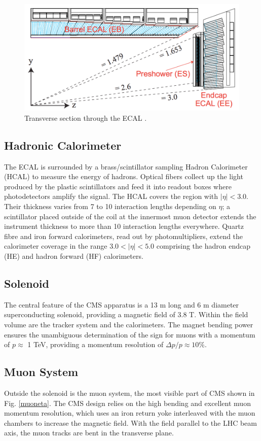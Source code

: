\begin{figure}[h!!]
\centering
\includegraphics[scale=0.35]{figures/experiment/cmsEcal.png}
\vskip 1cm
\caption[CMS ECAL]{Transverse section through the ECAL \cite{Bayatian:2006zz}.}
\label{cmsEcal}
\end{figure}

\subsection{Hadronic Calorimeter}
The ECAL is surrounded by a brass/scintillator sampling Hadron Calorimeter (HCAL) to measure the energy of hadrons. Optical fibers collect up the light produced by the plastic scintillators and feed it into readout boxes where photodetectors amplify the signal. The HCAL covers the region with $|\eta|<3.0$. Their thickness varies from 7 to 10 interaction lengths depending on $\eta$; a scintillator placed outside of the coil at the innermost muon detector extends the instrument thickness to more than 10 interaction lengths everywhere. Quartz fibre and iron forward calorimeters, read out by photomultipliers, extend the calorimeter coverage in the range $3.0 < |\eta| < 5.0$ comprising the hadron endcap (HE) and hadron forward (HF) calorimeters.

\subsection{Solenoid}
The central feature of the CMS apparatus is a 13 m long and 6 m diameter superconducting solenoid, providing a magnetic field of 3.8 T. Within the field volume are the tracker system and the calorimeters. The magnet bending power ensures the unambiguous determination of the sign for muons with a momentum of $p \approx$ 1 TeV, providing a momentum resolution of $\Delta p / p \approx 10 \%$.

\subsection{Muon System}
Outside the solenoid is the muon system, the most visible part of CMS shown in Fig. \ref{muoneta}. The CMS design relies on the high bending and excellent muon momentum resolution, which uses an iron return yoke interleaved with the muon chambers to increase the magnetic field. With the field parallel to the LHC beam axis, the muon tracks are bent in the transverse plane. 

